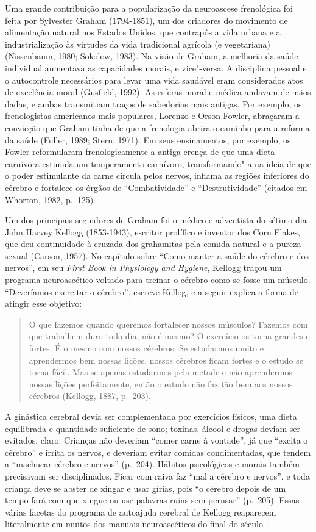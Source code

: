 Uma grande contribuição para a popularização da neuroascese frenológica
foi feita por Sylvester Graham (1794-1851), um dos criadores do
movimento de alimentação natural nos Estados Unidos, que contrapôs a vida
urbana e a industrialização às virtudes da vida tradicional
agrícola (e vegetariana) (Nissenbaum, 1980; Sokolow, 1983). Na visão de
Graham, a melhoria da saúde individual aumentava as capacidades morais,
e vice"-versa. A disciplina pessoal e o autocontrole necessários para
levar uma vida saudável eram considerados atos de excelência moral
(Gusfield, 1992). As esferas moral e médica andavam de mãos dadas, e
ambas transmitiam traços de sabedorias mais antigas. Por exemplo, os
frenologistas americanos mais populares, Lorenzo e Orson Fowler,
abraçaram a convicção que Graham tinha de que a frenologia abrira o
caminho para a reforma da saúde (Fuller, 1989; Stern, 1971). Em seus
ensinamentos, por exemplo, os Fowler reformularam frenologicamente a
antiga crença de que uma dieta carnívora estimula um temperamento
carnívoro, transformando"-a na ideia de que o poder estimulante da carne
circula pelos nervos, inflama as regiões inferiores do cérebro e
fortalece os órgãos de ``Combatividade'' e ``Destrutividade'' (citados
em Whorton, 1982, p.~125).

Um dos principais seguidores de Graham foi o médico e adventista do
sétimo dia John Harvey Kellogg (1853-1943), escritor prolífico e
inventor dos Corn Flakes, que deu continuidade à cruzada dos grahamitas
pela comida natural e a pureza sexual (Carson, 1957). No capítulo sobre
``Como manter a saúde do cérebro e dos nervos'', em seu \emph{First Book
in Physiology and Hygiene}, Kellogg traçou um programa neuroascético
voltado para treinar o cérebro como se fosse um músculo. ``Deveríamos
exercitar o cérebro'', escreve Kellog, e a seguir explica a forma de
atingir esse objetivo:

\begin{quote}
O que fazemos quando queremos fortalecer nossos músculos? Fazemos com
que trabalhem duro todo dia, não é mesmo? O exercício os torna grandes e
fortes. É o mesmo com nossos cérebros. Se estudarmos muito e aprendermos
bem nossas lições, nossos cérebros ficam fortes e o estudo se torna
fácil. Mas se apenas estudarmos pela metade e não aprendermos nossas
lições perfeitamente, então o estudo não faz tão bem aos nossos
cérebros (Kellogg, 1887, p.~203).
\end{quote}

A ginástica cerebral devia ser complementada por exercícios físicos, uma
dieta equilibrada e quantidade suficiente de sono; toxinas, álcool e
drogas deviam ser evitados, claro. Crianças não deveriam ``comer carne à
vontade'', já que ``excita o cérebro'' e irrita os nervos, e deveriam evitar comidas
condimentadas, que tendem a ``machucar cérebro e nervos'' (p.~204).
Hábitos psicológicos e morais também precisavam ser disciplinados. Ficar
com raiva faz ``mal a cérebro e nervos'', e toda criança deve se abster
de xingar e usar gírias, pois ``o cérebro depois de um tempo fará com
que xingue ou use palavras ruins sem pernsar'' (p.~205). Essas várias
facetas do programa de autoajuda cerebral de Kellogg reaparecem
literalmente em muitos dos manuais neuroascéticos do final do século .


